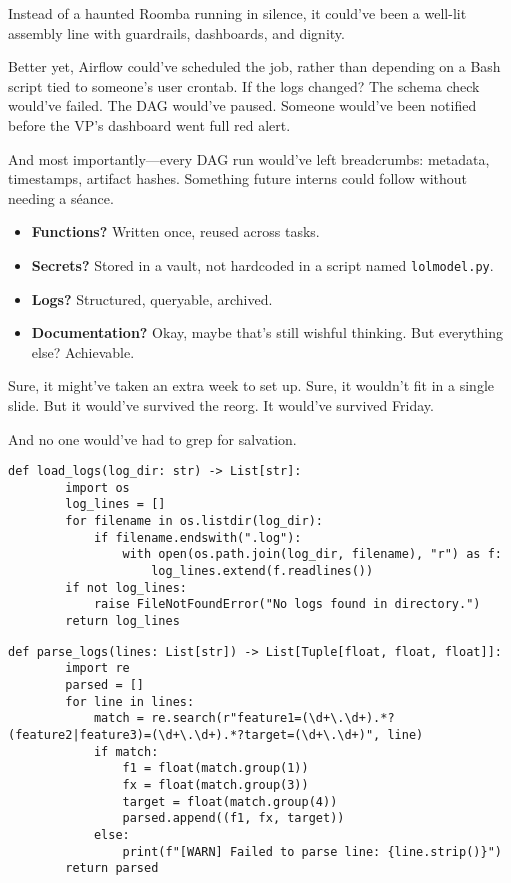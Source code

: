     
    


Instead of a haunted Roomba running in silence, it could’ve been a well-lit assembly line with guardrails, dashboards, and dignity.

Better yet, Airflow could’ve scheduled the job, rather than depending on a Bash script tied to someone’s user crontab. If the logs changed? The schema check would’ve failed. The DAG would’ve paused. Someone would’ve been notified before the VP’s dashboard went full red alert.

And most importantly—every DAG run would’ve left breadcrumbs: metadata, timestamps, artifact hashes. Something future interns could follow without needing a séance.

\begin{itemize}
    \item \textbf{Functions?} Written once, reused across tasks.  
    \item \textbf{Secrets?} Stored in a vault, not hardcoded in a script named \texttt{lolmodel.py}.  
    \item \textbf{Logs?} Structured, queryable, archived.  
    \item \textbf{Documentation?} Okay, maybe that’s still wishful thinking. But everything else? Achievable.
\end{itemize}

Sure, it might’ve taken an extra week to set up.  Sure, it wouldn’t fit in a single slide.  But it would’ve survived the reorg.  It would’ve survived Friday.

And no one would’ve had to grep for salvation.


\begin{lstlisting}[caption={Load logs from a directory.}, label={lst:load_logs}]
    def load_logs(log_dir: str) -> List[str]:
        import os
        log_lines = []
        for filename in os.listdir(log_dir):
            if filename.endswith(".log"):
                with open(os.path.join(log_dir, filename), "r") as f:
                    log_lines.extend(f.readlines())
        if not log_lines:
            raise FileNotFoundError("No logs found in directory.")
        return log_lines
\end{lstlisting}
    

\begin{lstlisting}[caption={Parse structured fields from log lines.}, label={lst:parse_logs}]
    def parse_logs(lines: List[str]) -> List[Tuple[float, float, float]]:
        import re
        parsed = []
        for line in lines:
            match = re.search(r"feature1=(\d+\.\d+).*?(feature2|feature3)=(\d+\.\d+).*?target=(\d+\.\d+)", line)
            if match:
                f1 = float(match.group(1))
                fx = float(match.group(3))
                target = float(match.group(4))
                parsed.append((f1, fx, target))
            else:
                print(f"[WARN] Failed to parse line: {line.strip()}")
        return parsed
\end{lstlisting}



